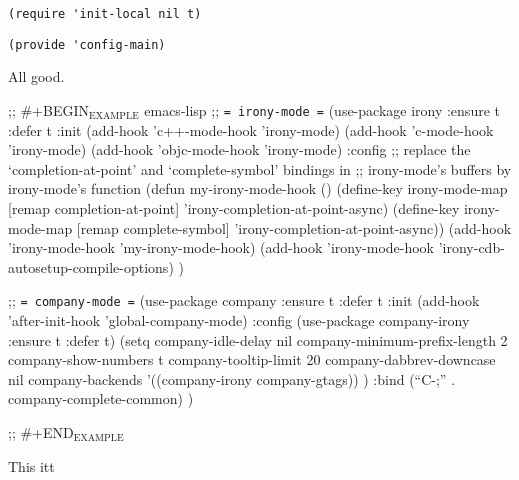 \documentclass[12pt]{article}
\begin{document}
\lstset{language=Lisp,label= ,caption= ,captionpos=b,numbers=none}
\begin{lstlisting}
(require 'init-local nil t)
\end{lstlisting}


\lstset{language=Lisp,label= ,caption= ,captionpos=b,numbers=none}
\begin{lstlisting}
(provide 'config-main)
\end{lstlisting}

All good.


;;  \#+BEGIN\(_{\text{EXAMPLE}}\) emacs-lisp
  ;; \texttt{= irony-mode =}
  (use-package irony
    :ensure t
    :defer t
    :init
    (add-hook 'c++-mode-hook 'irony-mode)
    (add-hook 'c-mode-hook 'irony-mode)
    (add-hook 'objc-mode-hook 'irony-mode)
    :config
    ;; replace the `completion-at-point' and `complete-symbol' bindings in
    ;; irony-mode's buffers by irony-mode's function
    (defun my-irony-mode-hook ()
      (define-key irony-mode-map [remap completion-at-point]
        'irony-completion-at-point-async)
      (define-key irony-mode-map [remap complete-symbol]
        'irony-completion-at-point-async))
    (add-hook 'irony-mode-hook 'my-irony-mode-hook)
    (add-hook 'irony-mode-hook 'irony-cdb-autosetup-compile-options)
    )

;; \texttt{= company-mode =}
(use-package company
  :ensure t
  :defer t
  :init (add-hook 'after-init-hook 'global-company-mode)
  :config
  (use-package company-irony :ensure t :defer t)
  (setq company-idle-delay              nil
  company-minimum-prefix-length   2
  company-show-numbers            t
  company-tooltip-limit           20
  company-dabbrev-downcase        nil
  company-backends                '((company-irony company-gtags))
  )
  :bind (``C-;'' . company-complete-common)
  )

;;  \#+END\(_{\text{EXAMPLE}}\)





This itt 
\end{document}
